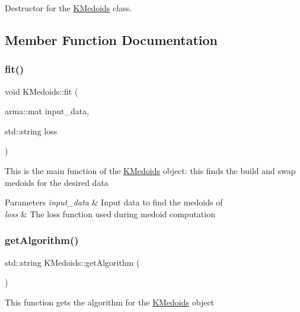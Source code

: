Destructor for the \hyperlink{classKMedoids}{K\+Medoids} class. 

\subsection{Member Function Documentation}
\mbox{\label{classKMedoids_ae241800e72a6b4a677333ffbf06e1798}} 
\subsubsection{\texorpdfstring{fit()}{fit()}}
{\footnotesize\ttfamily void K\+Medoids\+::fit (\begin{DoxyParamCaption}\item[{arma\+::mat}]{input\+\_\+data,  }\item[{std\+::string}]{loss }\end{DoxyParamCaption})}

This is the main function of the \hyperlink{classKMedoids}{K\+Medoids} object\+: this finds the build and swap medoids for the desired data


\begin{DoxyParams}{Parameters}
{\em input\+\_\+data} & Input data to find the medoids of \\
\hline
{\em loss} & The loss function used during medoid computation \\
\hline
\end{DoxyParams}
\mbox{\label{classKMedoids_a01a1bf63fdd2cd8b389c3f1c0619388f}} 
\subsubsection{\texorpdfstring{get\+Algorithm()}{getAlgorithm()}}
{\footnotesize\ttfamily std\+::string K\+Medoids\+::get\+Algorithm (\begin{DoxyParamCaption}{ }\end{DoxyParamCaption})}

This function gets the algorithm for the \hyperlink{classKMedoids}{K\+Medoids} object \mbox{\label{classKMedoids_a89474787892880381e4d0282de541d03}} 
